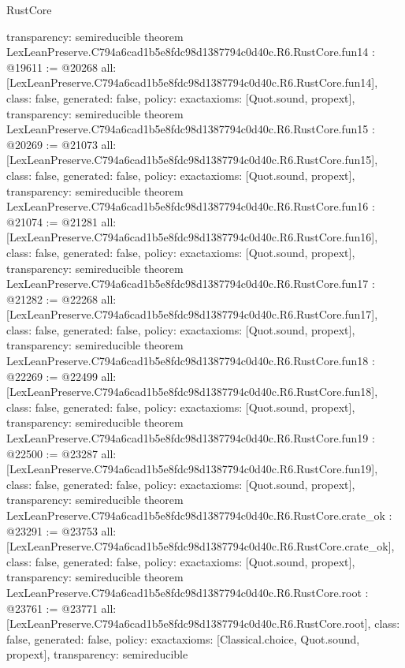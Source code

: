\begin{lexlean}{RustCore}
\begin{coremodule}
{  transparency: semireducible
}
theorem LexLeanPreserve.C794a6cad1b5e8fdc98d1387794c0d40c.R6.RustCore.fun14 : @19611 := @20268 {
  all: [LexLeanPreserve.C794a6cad1b5e8fdc98d1387794c0d40c.R6.RustCore.fun14],
  class: false,
  generated: false,
  policy: exact{axioms: [Quot.sound, propext]},
  transparency: semireducible
}
theorem LexLeanPreserve.C794a6cad1b5e8fdc98d1387794c0d40c.R6.RustCore.fun15 : @20269 := @21073 {
  all: [LexLeanPreserve.C794a6cad1b5e8fdc98d1387794c0d40c.R6.RustCore.fun15],
  class: false,
  generated: false,
  policy: exact{axioms: [Quot.sound, propext]},
  transparency: semireducible
}
theorem LexLeanPreserve.C794a6cad1b5e8fdc98d1387794c0d40c.R6.RustCore.fun16 : @21074 := @21281 {
  all: [LexLeanPreserve.C794a6cad1b5e8fdc98d1387794c0d40c.R6.RustCore.fun16],
  class: false,
  generated: false,
  policy: exact{axioms: [Quot.sound, propext]},
  transparency: semireducible
}
theorem LexLeanPreserve.C794a6cad1b5e8fdc98d1387794c0d40c.R6.RustCore.fun17 : @21282 := @22268 {
  all: [LexLeanPreserve.C794a6cad1b5e8fdc98d1387794c0d40c.R6.RustCore.fun17],
  class: false,
  generated: false,
  policy: exact{axioms: [Quot.sound, propext]},
  transparency: semireducible
}
theorem LexLeanPreserve.C794a6cad1b5e8fdc98d1387794c0d40c.R6.RustCore.fun18 : @22269 := @22499 {
  all: [LexLeanPreserve.C794a6cad1b5e8fdc98d1387794c0d40c.R6.RustCore.fun18],
  class: false,
  generated: false,
  policy: exact{axioms: [Quot.sound, propext]},
  transparency: semireducible
}
theorem LexLeanPreserve.C794a6cad1b5e8fdc98d1387794c0d40c.R6.RustCore.fun19 : @22500 := @23287 {
  all: [LexLeanPreserve.C794a6cad1b5e8fdc98d1387794c0d40c.R6.RustCore.fun19],
  class: false,
  generated: false,
  policy: exact{axioms: [Quot.sound, propext]},
  transparency: semireducible
}
theorem LexLeanPreserve.C794a6cad1b5e8fdc98d1387794c0d40c.R6.RustCore.crate_ok : @23291 := @23753 {
  all: [LexLeanPreserve.C794a6cad1b5e8fdc98d1387794c0d40c.R6.RustCore.crate_ok],
  class: false,
  generated: false,
  policy: exact{axioms: [Quot.sound, propext]},
  transparency: semireducible
}
theorem LexLeanPreserve.C794a6cad1b5e8fdc98d1387794c0d40c.R6.RustCore.root : @23761 := @23771 {
  all: [LexLeanPreserve.C794a6cad1b5e8fdc98d1387794c0d40c.R6.RustCore.root],
  class: false,
  generated: false,
  policy: exact{axioms: [Classical.choice, Quot.sound, propext]},
  transparency: semireducible
}


\end{coremodule}
\end{lexlean}
